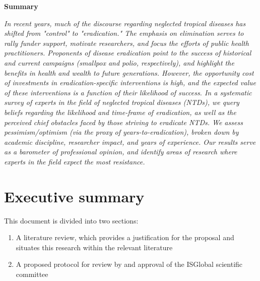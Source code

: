 \documentclass{article}
\begin{document}
\begin{changemargin}{3cm}{3cm} 

\begin{center}
\textbf{Summary}
\end{center}

\emph{In recent years, much of the discourse regarding neglected tropical diseases has shifted from "control" to "eradication." The emphasis on elimination serves to rally funder support, motivate researchers, and focus the efforts of public health practitioners. Proponents of disease eradication point to the success of historical and current campaigns (smallpox and polio, respectively), and highlight the benefits in health and wealth to future generations. However, the opportunity cost of investments in eradication-specific interventions is high, and the expected value of these interventions is a function of their likelihood of success. In a systematic survey of experts in the field of neglected tropical diseases (NTDs), we query beliefs regarding the likelihood and time-frame of eradication, as well as the perceived chief obstacles faced by those striving to eradicate NTDs. We assess pessimism/optimism (via the proxy of years-to-eradication), broken down by academic discipline, researcher impact, and years of experience. Our results serve as a barometer of professional opinion, and identify areas of research where experts in the field expect the most resistance.}
\end{changemargin}
\vfill  

\newpage


\section*{Executive summary}

This document is divided into two sections:

\begin{enumerate}
\item A literature review, which provides a justification for the proposal and situates this research within the relevant literature
\item A proposed protocol for review by and approval of the ISGlobal scientific committee
\end{enumerate}



\vspace{5mm}

\tableofcontents


\newpage  
\end{document}
